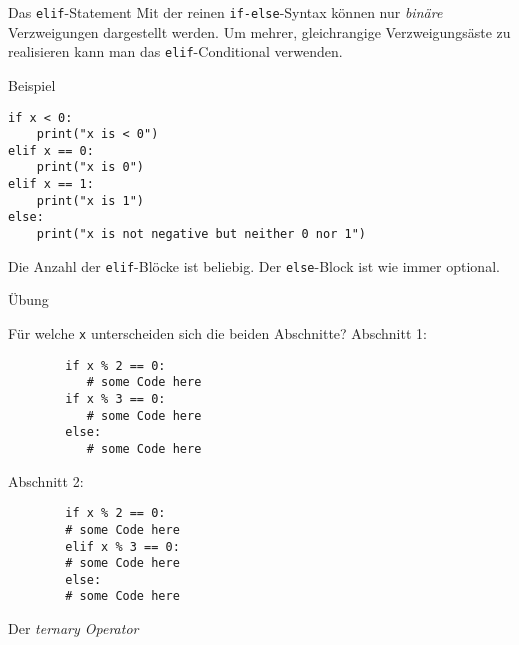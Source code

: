 \documentclass[algorithm,pgfplots,colortheme=light]{cuzbeamer}
\newcommand{\pybw}[1]{\texttt{#1}}
\begin{document}
\begin{fragile}

\begin{block}{Das \pybw{elif}-Statement}
	\vspace{2pt}
Mit der reinen \pybw{if-else}-Syntax können nur \emph{binäre} Verzweigungen dargestellt werden. Um mehrer, gleichrangige Verzweigungsäste zu realisieren kann man das \pybw{elif}-Conditional verwenden. 
\end{block}
\pause
\begin{exampleblock}{Beispiel}
\begin{verbatim}
if x < 0: 
    print("x is < 0")
elif x == 0: 
    print("x is 0")
elif x == 1: 
    print("x is 1")
else: 
    print("x is not negative but neither 0 nor 1")         
\end{verbatim}
\end{exampleblock}
\pause
Die Anzahl der \pybw{elif}-Blöcke ist beliebig. Der \pybw{else}-Block ist wie immer optional. 

\end{fragile}

\begin{fragile}{Übung}
	\begin{block}{Für welche \pybw{x} unterscheiden sich die beiden Abschnitte?}
		\vspace{5pt}
		Abschnitt 1: 
		\begin{verbatim}
		if x % 2 == 0: 
		   # some Code here
		if x % 3 == 0: 
		   # some Code here
		else: 
		   # some Code here  
		\end{verbatim}
		Abschnitt 2: 
		\begin{verbatim}
		if x % 2 == 0: 
		# some Code here
		elif x % 3 == 0: 
		# some Code here
		else: 
		# some Code here  
		\end{verbatim}
	\end{block}
\end{fragile}


\begin{frame}

\begin{block}{Der \emph{ternary Operator}}
\end{block}
\end{frame}
\end{document}
